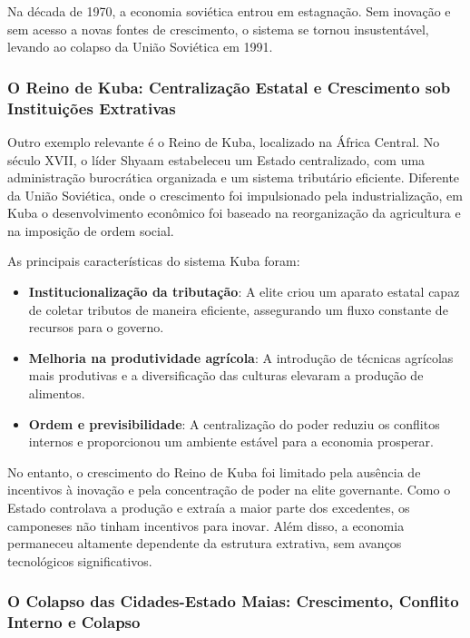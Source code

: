 \documentclass[a4paper,12pt]{article}[abntex2]
\begin{document}
Na década de 1970, a economia soviética entrou em estagnação. Sem inovação e sem acesso a novas fontes de crescimento, o sistema se tornou insustentável, levando ao colapso da União Soviética em 1991.

\subsubsection{\textbf{O Reino de Kuba: Centralização Estatal e Crescimento sob Instituições Extrativas}}

Outro exemplo relevante é o Reino de Kuba, localizado na África Central. No século XVII, o líder Shyaam estabeleceu um Estado centralizado, com uma administração burocrática organizada e um sistema tributário eficiente. Diferente da União Soviética, onde o crescimento foi impulsionado pela industrialização, em Kuba o desenvolvimento econômico foi baseado na reorganização da agricultura e na imposição de ordem social.

As principais características do sistema Kuba foram:

\begin{itemize}
    \item \textbf{Institucionalização da tributação}: A elite criou um aparato estatal capaz de coletar tributos de maneira eficiente, assegurando um fluxo constante de recursos para o governo.
    
    \item \textbf{Melhoria na produtividade agrícola}: A introdução de técnicas agrícolas mais produtivas e a diversificação das culturas elevaram a produção de alimentos.
    
    \item \textbf{Ordem e previsibilidade}: A centralização do poder reduziu os conflitos internos e proporcionou um ambiente estável para a economia prosperar.
\end{itemize}

No entanto, o crescimento do Reino de Kuba foi limitado pela ausência de incentivos à inovação e pela concentração de poder na elite governante. Como o Estado controlava a produção e extraía a maior parte dos excedentes, os camponeses não tinham incentivos para inovar. Além disso, a economia permaneceu altamente dependente da estrutura extrativa, sem avanços tecnológicos significativos.

\subsubsection{\textbf{O Colapso das Cidades-Estado Maias: Crescimento, Conflito Interno e Colapso}}
\end{document}
